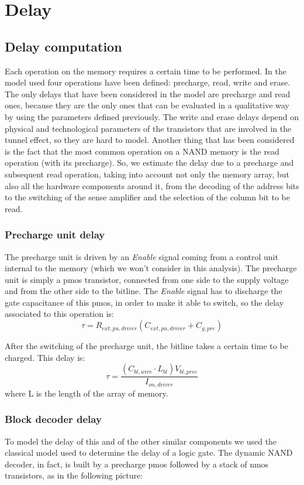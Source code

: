 \chapter{Delay}
\graphicspath{{foto/Chap2/}}
\label{sec:Delay}
\section{Delay computation}
Each operation on the memory requires a certain time to be performed. In the model used four operations have been defined: precharge, read, write and erase. The only delays that have been considered in the model are precharge and read ones, because they are the only ones that can be evaluated in a qualitative way by using the parameters defined previously. The write and erase delays depend on physical and technological parameters of the transistors that are involved in the tunnel effect, so they are hard to model. Another thing that has been considered is the fact that the most common operation on a NAND memory is the read operation (with its precharge). So, we estimate the delay due to a precharge and subsequent read operation, taking into account not only the memory array, but also all the hardware components around it, from the decoding of the address bits to the switching of the sense amplifier and the selection of the column bit to be read.

\subsection{Precharge unit delay}
The precharge unit is driven by an \textit{Enable} signal coming from a control unit internal to the memory (which we won't consider in this analysis). The precharge unit is simply a pmos transistor, connected from one side to the supply voltage and from the other side to the bitline. The \textit{Enable} signal has to discharge the gate capacitance of this pmos, in order to make it able to switch, so the delay associated to this operation is:
$$\tau=R_{ext,pu,driver}(C_{ext,pu,driver}+C_{g,pre})$$

After the switching of the precharge unit, the bitline takes a certain time to be charged. This delay is:
$$\tau=\frac{(C_{bl,wire} \cdot L_{bl})V_{bl,prec}}{I_{on,driver}}$$
where L is the length of the array of memory.

\subsection{Block decoder delay}
To model the delay of this and of the other similar components we used the classical model used to determine the delay of a logic gate. The dynamic NAND decoder, in fact, is built by a precharge pmos followed by a stack of nmos transistors, as in the following picture:


